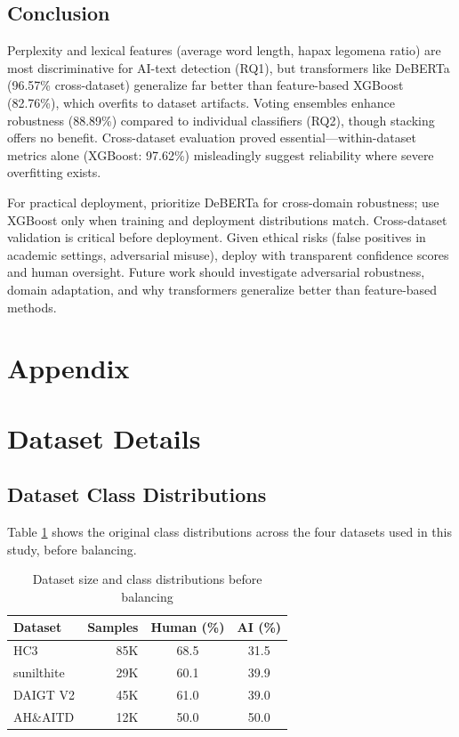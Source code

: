 \documentclass[11pt]{article}
\begin{document}
\subsection{Conclusion}
\label{sec:conclusion}
Perplexity and lexical features (average word length, hapax legomena ratio) are most discriminative for AI-text detection (RQ1), but transformers like DeBERTa (96.57\% cross-dataset) generalize far better than feature-based XGBoost (82.76\%), which overfits to dataset artifacts. Voting ensembles enhance robustness (88.89\%) compared to individual classifiers (RQ2), though stacking offers no benefit. Cross-dataset evaluation proved essential—within-dataset metrics alone (XGBoost: 97.62\%) misleadingly suggest reliability where severe overfitting exists.

For practical deployment, prioritize DeBERTa for cross-domain robustness; use XGBoost only when training and deployment distributions match. Cross-dataset validation is critical before deployment. Given ethical risks (false positives in academic settings, adversarial misuse), deploy with transparent confidence scores and human oversight. Future work should investigate adversarial robustness, domain adaptation, and why transformers generalize better than feature-based methods.

\balance





\appendix
\section*{Appendix}

\section{Dataset Details}
\label{sec:dataset-details}

\subsection{Dataset Class Distributions}
Table \ref{tab:dataset-class-distribution} shows the original class distributions across the four datasets used in this study, before balancing.

\begin{table}[H]
\centering
\footnotesize
\begin{tabular}{lrcc}
\toprule
\textbf{Dataset} & \textbf{Samples} & \textbf{Human (\%)} & \textbf{AI (\%)} \\
\midrule
HC3 & 85K & 68.5 & 31.5 \\
sunilthite & 29K & 60.1 & 39.9 \\
DAIGT V2 & 45K & 61.0 & 39.0 \\
AH\&AITD & 12K & 50.0 & 50.0 \\
\bottomrule
\end{tabular}
\caption{Dataset size and class distributions before balancing}
\label{tab:dataset-class-distribution}
\end{table}
\end{document}
